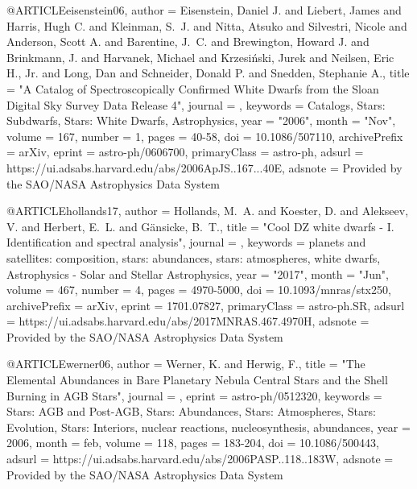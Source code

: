 \documentclass[a4paper,fleqn,usenatbib]{mnras}
\begin{document}
@ARTICLE{eisenstein06,
       author = {{Eisenstein}, Daniel J. and {Liebert}, James and {Harris}, Hugh C. and
         {Kleinman}, S.~J. and {Nitta}, Atsuko and {Silvestri}, Nicole and
         {Anderson}, Scott A. and {Barentine}, J.~C. and
         {Brewington}, Howard J. and {Brinkmann}, J. and {Harvanek}, Michael and
         {Krzesi{\'n}ski}, Jurek and {Neilsen}, Eric H., Jr. and {Long}, Dan and
         {Schneider}, Donald P. and {Snedden}, Stephanie A.},
        title = "{A Catalog of Spectroscopically Confirmed White Dwarfs from the Sloan Digital Sky Survey Data Release 4}",
      journal = {\apjs},
     keywords = {Catalogs, Stars: Subdwarfs, Stars: White Dwarfs, Astrophysics},
         year = "2006",
        month = "Nov",
       volume = {167},
       number = {1},
        pages = {40-58},
          doi = {10.1086/507110},
archivePrefix = {arXiv},
       eprint = {astro-ph/0606700},
 primaryClass = {astro-ph},
       adsurl = {https://ui.adsabs.harvard.edu/abs/2006ApJS..167...40E},
      adsnote = {Provided by the SAO/NASA Astrophysics Data System}
}


@ARTICLE{hollands17,
       author = {{Hollands}, M.~A. and {Koester}, D. and {Alekseev}, V. and
         {Herbert}, E.~L. and {G{\"a}nsicke}, B.~T.},
        title = "{Cool DZ white dwarfs - I. Identification and spectral analysis}",
      journal = {\mnras},
     keywords = {planets and satellites: composition, stars: abundances, stars: atmospheres, white dwarfs, Astrophysics - Solar and Stellar Astrophysics},
         year = "2017",
        month = "Jun",
       volume = {467},
       number = {4},
        pages = {4970-5000},
          doi = {10.1093/mnras/stx250},
archivePrefix = {arXiv},
       eprint = {1701.07827},
 primaryClass = {astro-ph.SR},
       adsurl = {https://ui.adsabs.harvard.edu/abs/2017MNRAS.467.4970H},
      adsnote = {Provided by the SAO/NASA Astrophysics Data System}
}


@ARTICLE{werner06,
   author = {{Werner}, K. and {Herwig}, F.},
    title = "{The Elemental Abundances in Bare Planetary Nebula Central Stars and the Shell Burning in AGB Stars}",
  journal = {\pasp},
   eprint = {astro-ph/0512320},
 keywords = {Stars: AGB and Post-AGB, Stars: Abundances, Stars: Atmospheres, Stars: Evolution, Stars: Interiors, nuclear reactions, nucleosynthesis, abundances},
     year = 2006,
    month = feb,
   volume = 118,
    pages = {183-204},
      doi = {10.1086/500443},
   adsurl = {https://ui.adsabs.harvard.edu/abs/2006PASP..118..183W},
  adsnote = {Provided by the SAO/NASA Astrophysics Data System}
}
\end{document}
